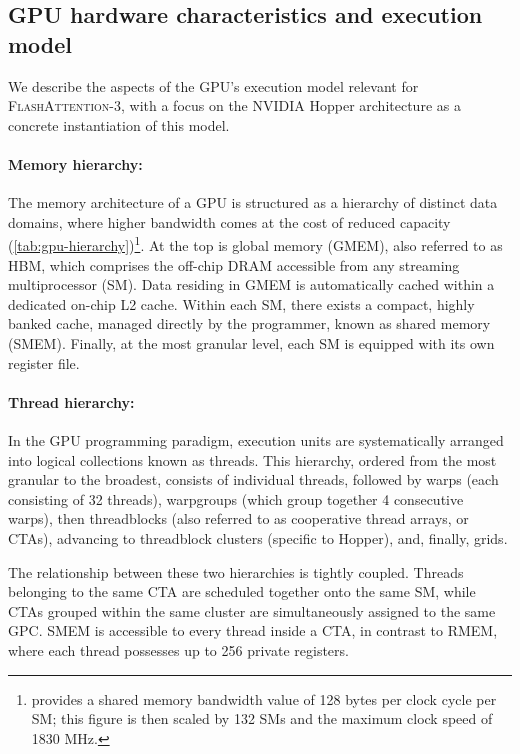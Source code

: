 \subsection{GPU hardware characteristics and execution model}
\label{subsec:hardware}

We describe the aspects of the GPU's execution model relevant for \textsc{FlashAttention-3}, with a focus on the NVIDIA Hopper architecture as a concrete instantiation of this model.

\paragraph{Memory hierarchy:} The memory architecture of a GPU is structured as a hierarchy of distinct data domains, where higher bandwidth comes at the cost of reduced capacity (\cref{tab:gpu-hierarchy})\footnote{\citet{luo2024benchmarking} provides a shared memory bandwidth value of 128 bytes per clock cycle per SM; this figure is then scaled by 132 SMs and the maximum clock speed of 1830 MHz.}. At the top is global memory (GMEM), also referred to as HBM, which comprises the off-chip DRAM accessible from any streaming multiprocessor (SM). Data residing in GMEM is automatically cached within a dedicated on-chip L2 cache. Within each SM, there exists a compact, highly banked cache, managed directly by the programmer, known as shared memory (SMEM). Finally, at the most granular level, each SM is equipped with its own register file.

\paragraph{Thread hierarchy:} In the GPU programming paradigm, execution units are systematically arranged into logical collections known as threads. This hierarchy, ordered from the most granular to the broadest, consists of individual threads, followed by warps (each consisting of 32 threads), warpgroups (which group together 4 consecutive warps), then threadblocks (also referred to as cooperative thread arrays, or CTAs), advancing to threadblock clusters (specific to Hopper), and, finally, grids.

The relationship between these two hierarchies is tightly coupled. Threads belonging to the same CTA are scheduled together onto the same SM, while CTAs grouped within the same cluster are simultaneously assigned to the same GPC. SMEM is accessible to every thread inside a CTA, in contrast to RMEM, where each thread possesses up to 256 private registers.

